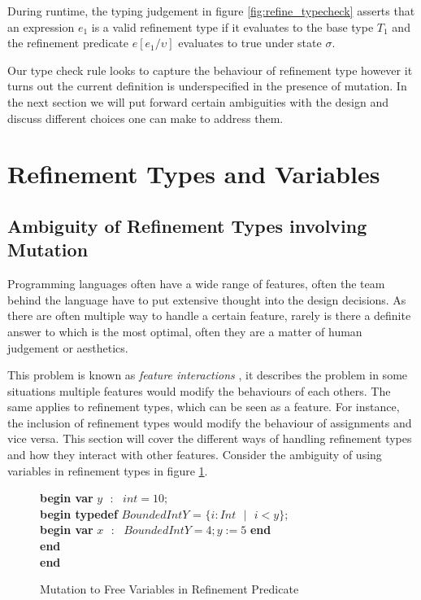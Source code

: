 \documentclass[a4paper,12pt]{report}
\newenvironment{tabs}[1]
 {\flushleft\TabPositions{#1}}
 {\endflushleft}
\begin{document}
\par
During runtime, the typing judgement in figure \ref{fig:refine_typecheck} 
asserts that an expression $e_1$ is a valid refinement type if it 
evaluates to the base type $T_1$ and the refinement predicate $e[e_1/\upsilon]$ 
evaluates to true under state $\sigma$.

\par
Our type check rule looks to capture the behaviour of refinement type however it 
turns out the current definition is underspecified in the presence of mutation. 
In the next section we will put forward certain ambiguities with the 
design and discuss different choices one can make to address them.

\section{Refinement Types and Variables}
\subsection{Ambiguity of Refinement Types involving Mutation}
Programming languages often have a wide range of features, often the team behind 
the language have to put extensive thought into the design decisions. As there 
are often multiple way to handle a certain feature, rarely is there a definite 
answer to which is the most optimal, often they are a matter of human judgement 
or aesthetics. 

\par
This problem is known as \textit{feature interactions} 
\cite{featInteract}, it describes the problem in some situations multiple 
features would modify the behaviours of each others. The same applies to 
refinement types, which can be seen as a feature. For instance, the inclusion 
of refinement types would modify the behaviour of assignments and vice versa. 
This section will cover the different ways of handling refinement types and how 
they interact with other features. Consider the ambiguity of using variables 
in refinement types in figure \ref{fig:amb_refinement_vars}.

\begin{figure} [H]
  \begin{tabs}{1cm,2cm}
    \textbf{begin var }$y\text{ }:\text{ } int = 10;$ \\
    \tab\textbf{begin typedef }$BoundedIntY$ = $\{i : Int\text{ }|\text{ } i < y\}$; \\ 
    \tab\tab\textbf{begin var }$x\text{ }:\text{ }BoundedIntY = 4;y := 5$\textbf { end} \\
    \tab\textbf {end} \\
    \textbf{end}
  \end{tabs}  
  \caption{Mutation to Free Variables in Refinement Predicate}
  \label{fig:amb_refinement_vars}
\end{figure}
\end{document}

